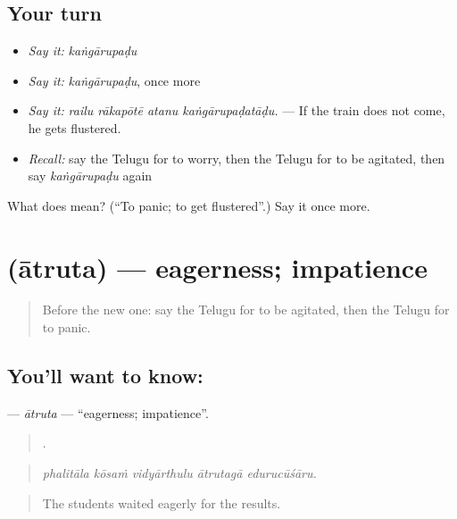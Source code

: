 \subsection*{Your turn}
\begin{itemize}
\raggedright
  \item \emph{Say it:} \emph{kaṅgārupaḍu}
  \item \emph{Say it:} \emph{kaṅgārupaḍu}, once more
  \item \emph{Say it:} \emph{railu rākapōtē atanu kaṅgārupaḍatāḍu.} — If the train does not come, he gets flustered.
  \item \emph{Recall:} say the Telugu for to worry, then the Telugu for to be agitated, then say \emph{kaṅgārupaḍu} again
\end{itemize}

\begin{tcolorbox}[breakable,colback=teal!4,colframe=teal!35!black,title={Before you move on}]
What does  mean? (\textquotedblleft{}To panic; to get flustered\textquotedblright{}.) Say it once more.
\end{tcolorbox}
\section[\texorpdfstring{\te{ఆత్రుత} (ātruta)}{ఆత్రుత (ātruta)}]{ (ātruta) — eagerness; impatience}

\label{lesson:TE-C494-atruta}



\begin{quote}
Before the new one: say the Telugu for to be agitated, then the Telugu for to panic.
\end{quote}

\subsection*{You'll want to know: }
\textbf{} — \emph{ātruta} — \textquotedblleft{}eagerness; impatience\textquotedblright{}.

\begin{quote}
    .
\end{quote}

\begin{quote}
\emph{phalitāla kōsaṁ vidyārthulu ātrutagā edurucūśāru.}
\end{quote}

\begin{quote}
The students waited eagerly for the results.
\end{quote}

